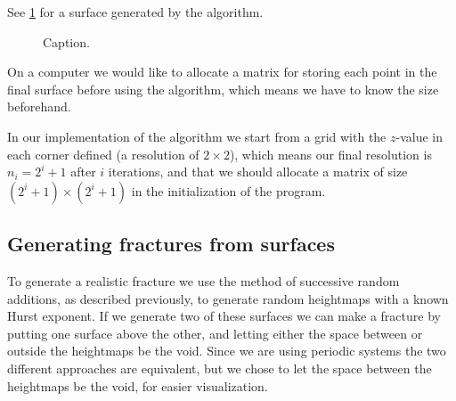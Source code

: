 See \cref{fig:diamond_square_surface} for a surface generated by the algorithm.

\begin{figure}
    \centering
    
    \caption{
        Caption.
        \label{fig:diamond_square_surface}
    }
\end{figure}

On a computer we would like to allocate a matrix for storing each point in the final surface before using the algorithm, which means we have to know the size beforehand.

In our implementation of the algorithm we start from a grid with the $z$-value in each corner defined (a resolution of $2\times 2$), which means our final resolution is $n_i = 2^i + 1$ after $i$ iterations, and that we should allocate a matrix of size $(2^i + 1) \times (2^i + 1)$ in the initialization of the program.


\subsection{Generating fractures from surfaces}
To generate a realistic fracture we use the method of successive random additions, as described previously, to generate random heightmaps with a known Hurst exponent. If we generate two of these surfaces we can make a fracture by putting one surface above the other, and letting either the space between or outside the heightmaps be the void. Since we are using periodic systems the two different approaches are equivalent, but we chose to let the space between the heightmaps be the void, for easier visualization.

